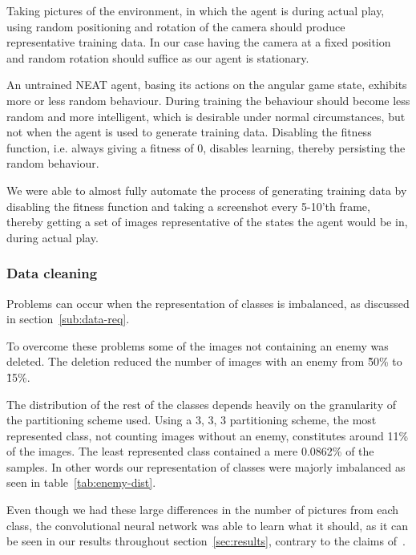 Taking pictures of the environment, in which the agent is during actual play, using random positioning and rotation of the camera should produce representative training data. In our case having the camera at a fixed position and random rotation should suffice as our agent is stationary.

An untrained NEAT agent, basing its actions on the angular game state, exhibits more or less random behaviour. During training the behaviour should become less random and more intelligent, which is desirable under normal circumstances, but not when the agent is used to generate training data. Disabling the fitness function, i.e. always giving a fitness of 0, disables learning, thereby persisting the random behaviour.

We were able to almost fully automate the process of generating training data by disabling the fitness function and taking a screenshot every 5-10'th frame,  thereby getting a set of images representative of the states the agent would be in, during actual play.


\subsubsection{Data cleaning}
Problems can occur when the representation of classes is imbalanced, as discussed in section~\ref{sub:data-req}.

To overcome these problems some of the images not containing an enemy was deleted. The deletion reduced the number of images with an enemy from \~50\% to \~15\%.

The distribution of the rest of the classes depends heavily on the granularity of the partitioning scheme used. Using a 3, 3, 3 partitioning scheme, the most represented class, not counting images without an enemy, constitutes around 11\% of the images. The least represented class contained a mere 0.0862\% of the samples. In other words our representation of classes were majorly imbalanced as seen in table~\ref{tab:enemy-dist}.

Even though we had these large differences in the number of pictures from each class, the convolutional neural network was able to learn what it should, as it can be seen in our results throughout section~\ref{sec:results}, contrary to the claims of~\cite{balanced-classes}.



